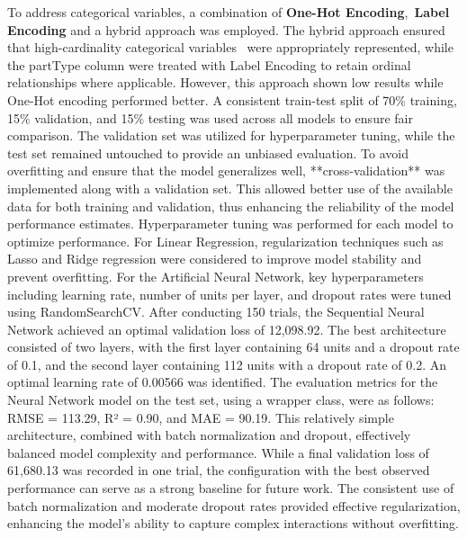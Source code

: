 \documentclass{article}
\begin{document}
To address categorical variables, a combination of \textbf{One-Hot Encoding}, \textbf{Label Encoding} and a hybrid approach was employed. The hybrid approach ensured that high-cardinality categorical variables  were appropriately represented, while the partType column were treated with Label Encoding to retain ordinal relationships where applicable. However, this approach shown low results while One-Hot encoding performed better. A consistent train-test split of 70\% training, 15\% validation, and 15\% testing was used across all models to ensure fair comparison. The validation set was utilized for hyperparameter tuning, while the test set remained untouched to provide an unbiased evaluation.
To avoid overfitting and ensure that the model generalizes well, **cross-validation** was implemented along with a validation set. This allowed better use of the available data for both training and validation, thus enhancing the reliability of the model performance estimates.
Hyperparameter tuning was performed for each model to optimize performance. For Linear Regression, regularization techniques such as Lasso and Ridge regression were considered to improve model stability and prevent overfitting. For the Artificial Neural Network, key hyperparameters including learning rate, number of units per layer, and dropout rates were tuned using RandomSearchCV. After conducting 150 trials, the Sequential Neural Network achieved an optimal validation loss of 12,098.92. The best architecture consisted of two layers, with the first layer containing 64 units and a dropout rate of 0.1, and the second layer containing 112 units with a dropout rate of 0.2. An optimal learning rate of 0.00566 was identified. The evaluation metrics for the Neural Network model on the test set, using a wrapper class, were as follows: RMSE = 113.29, R² = 0.90, and MAE = 90.19. This relatively simple architecture, combined with batch normalization and dropout, effectively balanced model complexity and performance. While a final validation loss of 61,680.13 was recorded in one trial, the configuration with the best observed performance can serve as a strong baseline for future work. The consistent use of batch normalization and moderate dropout rates provided effective regularization, enhancing the model's ability to capture complex interactions without overfitting.
\end{document}
